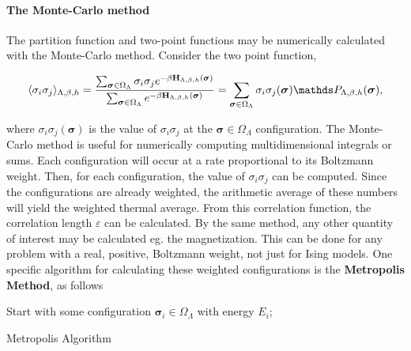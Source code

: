 \documentclass{homework}
\begin{document}
\clearpage

\paragraph{\textbf{The Monte-Carlo method}}

The partition function and two-point functions may be numerically calculated with the Monte-Carlo method. Consider the two point function, 

\begin{equation}
    \langle \sigma_i \sigma_j \rangle_{\Lambda, \beta, h} = \frac{\sum_{{\bm \sigma} \in \Omega_{\Lambda}} \sigma_i \sigma_j e^{-\beta {\bf H}_{\Lambda, \beta, h}({\bm \sigma})}}{\sum_{{\bm \sigma} \in \Omega_{\Lambda}} e^{-\beta {\bf H}_{\Lambda, \beta, h}({\bm \sigma})}} = \sum_{{\bm \sigma} \in \Omega_{\Lambda}} \sigma_i \sigma_j({\bm \sigma}) \prob_{\Lambda, \beta, h}{({\bm \sigma})},
\end{equation}

where $\sigma_i \sigma_j({\bm \sigma})$ is the value of $\sigma_i \sigma_j$ at the ${\bm \sigma} \in \Omega_{\Lambda}$ configuration. The Monte-Carlo method is useful for numerically computing multidimensional integrals or sums. Each configuration will occur at a rate proportional to its Boltzmann weight. Then, for each configuration, the value of $\sigma_i \sigma_j$ can be computed. Since the configurations are already weighted, the arithmetic average of these numbers will yield the weighted thermal average. From this correlation function, the correlation length $\varepsilon$ can be calculated. By the same method, any other quantity of interest may be calculated eg. the magnetization. This can be done for any problem with a real, positive, Boltzmann weight, not just for Ising models. One specific algorithm for calculating these weighted configurations is the \textbf{Metropolis Method}, as follows \\

\begin{algorithm}[H]
 \KwResult{}
 Start with some configuration ${\bm \sigma}_i \in \Omega_{\Lambda}$ with energy $E_i$;\
 \caption{Metropolis Algorithm}
\end{algorithm}
\end{document}
